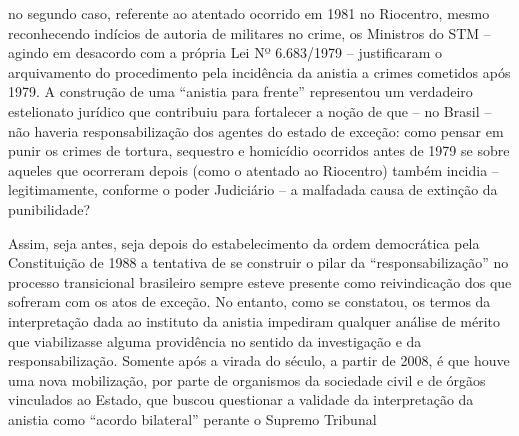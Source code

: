 no segundo caso, referente ao atentado ocorrido em 1981 no Riocentro,
mesmo reconhecendo indícios de autoria de militares no crime, os
Ministros do STM -- agindo em desacordo com a própria Lei Nº 6.683/1979
-- justificaram o arquivamento do procedimento pela incidência da
anistia a crimes cometidos após 1979. A construção de uma ``anistia para
frente'' representou um verdadeiro estelionato jurídico que contribuiu
para fortalecer a noção de que -- no Brasil -- não haveria
responsabilização dos agentes do estado de exceção: como pensar em punir
os crimes de tortura, sequestro e homicídio ocorridos antes de 1979 se
sobre aqueles que ocorreram depois (como o atentado ao Riocentro) também
incidia -- legitimamente, conforme o poder Judiciário -- a malfadada
causa de extinção da punibilidade?

Assim, seja antes, seja depois do estabelecimento da ordem democrática
pela Constituição de 1988 a tentativa de se construir o pilar da
``responsabilização'' no processo transicional brasileiro sempre esteve
presente como reivindicação dos que sofreram com os atos de exceção. No
entanto, como se constatou, os termos da interpretação dada ao instituto
da anistia impediram qualquer análise de mérito que viabilizasse alguma
providência no sentido da investigação e da responsabilização. Somente
após a virada do século, a partir de 2008, é que houve uma nova
mobilização, por parte de organismos da sociedade civil e de órgãos
vinculados ao Estado, que buscou questionar a validade da interpretação
da anistia como ``acordo bilateral'' perante o Supremo Tribunal
